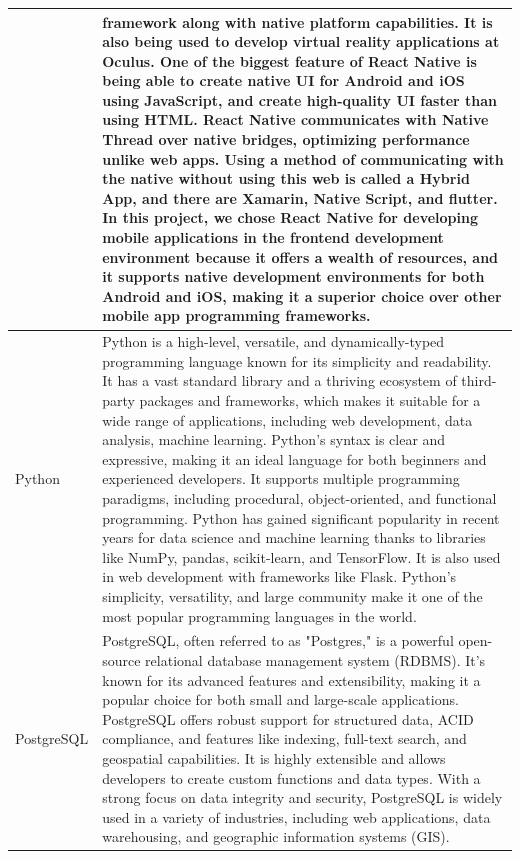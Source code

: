\documentclass[conference]{IEEEtran}
\begin{document}
\begin{table}[htbp]
    \centering
        \begin{tabular}{| p{1.2cm}|p{6.8cm} |} 
             \hline
             &
             framework along with native platform capabilities. It is also being used to develop virtual reality applications at Oculus. One of the biggest feature of React Native is being able to create native UI for Android and iOS using JavaScript, and create high-quality UI faster than using HTML.
             React Native communicates with Native Thread over native bridges, optimizing performance unlike web apps. Using a method of communicating with the native without using this web is called a Hybrid App, and there are Xamarin, Native Script, and flutter.
             In this project, we chose React Native for developing mobile applications in the frontend development environment because it offers a wealth of resources, and it supports native development environments for both Android and iOS, making it a superior choice over other mobile app programming frameworks. \\
             \hline
             Python & Python is a high-level, versatile, and dynamically-typed programming language known for its simplicity and readability. It has a vast standard library and a thriving ecosystem of third-party packages and frameworks, which makes it suitable for a wide range of applications, including web development, data analysis, machine learning. Python's syntax is clear and expressive, making it an ideal language for both beginners and experienced developers. It supports multiple programming paradigms, including procedural, object-oriented, and functional programming. Python has gained significant popularity in recent years for data science and machine learning thanks to libraries like NumPy, pandas, scikit-learn, and TensorFlow. It is also used in web development with frameworks like Flask. Python's simplicity, versatility, and large community make it one of the most popular programming languages in the world.\\
             \hline
             PostgreSQL &  PostgreSQL, often referred to as "Postgres," is a powerful open-source relational database management system (RDBMS). It's known for its advanced features and extensibility, making it a popular choice for both small and large-scale applications. PostgreSQL offers robust support for structured data, ACID compliance, and features like indexing, full-text search, and geospatial capabilities. It is highly extensible and allows developers to create custom functions and data types. With a strong focus on data integrity and security, PostgreSQL is widely used in a variety of industries, including web applications, data warehousing, and geographic information systems (GIS). \\ [1ex]
             \hline
        \end{tabular}
    \end{table}
    
\end{document}
